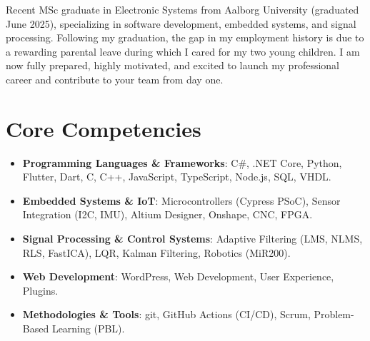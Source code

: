 \documentclass[11pt,a4paper,sans]{moderncv}
\begin{document}
\makecvtitle


\vspace{6pt}
\small{Recent MSc graduate in Electronic Systems from Aalborg University (graduated June 2025), specializing in software development, embedded systems, and signal processing. Following my graduation, the gap in my employment history is due to a rewarding parental leave during which I cared for my two young children. I am now fully prepared, highly motivated, and excited to launch my professional career and contribute to your team from day one.}


\section{Core Competencies}
\vspace{1pt}
\begin{itemize}

\item \textbf{Programming Languages \& Frameworks}: C\#, .NET Core, Python, Flutter, Dart, C, C++, JavaScript, TypeScript, Node.js, SQL, VHDL.

\item \textbf{Embedded Systems \& IoT}: Microcontrollers (Cypress PSoC), Sensor Integration (I2C, IMU), Altium Designer, Onshape, CNC, FPGA.

\item \textbf{Signal Processing \& Control Systems}: Adaptive Filtering (LMS, NLMS, RLS, FastICA), LQR, Kalman Filtering, Robotics (MiR200).

\item \textbf{Web Development}: WordPress, Web Development, User Experience, Plugins.

\item \textbf{Methodologies \& Tools}: git, GitHub Actions (CI/CD), Scrum, Problem-Based Learning (PBL).

\end{itemize}

\end{document}
